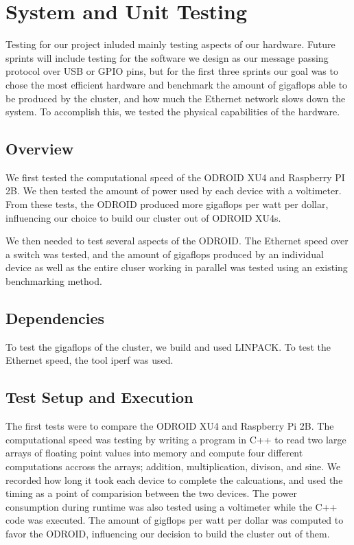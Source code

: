 
\chapter{System  and Unit Testing}

Testing for our project inluded mainly testing aspects of our hardware. Future sprints will include testing for the software we design as our message passing protocol over USB or GPIO pins, but for the first three sprints our goal was to chose the most efficient hardware and benchmark the amount of gigaflops able to be produced by the cluster, and how much the Ethernet network slows down the system. To accomplish this, we tested the physical capabilities of the hardware.

\section{Overview}
We first tested the computational speed of the ODROID XU4 and Raspberry PI 2B. We then tested the amount of power used by each device with a voltimeter. From these tests, the ODROID produced more gigaflops per watt per dollar, influencing our choice to build our cluster out of ODROID XU4s.

We then needed to test several aspects of the ODROID. The Ethernet speed over a switch was tested, and the amount of gigaflops produced by an individual device as well as the entire cluser working in parallel was tested using an existing benchmarking method.


\section{Dependencies}
To test the gigaflops of the cluster, we build and used LINPACK. To test the Ethernet speed, the tool iperf was used.


\section{Test Setup and Execution}
The first tests were to compare the ODROID XU4 and Raspberry Pi 2B. The computational speed was testing by writing a program in C++ to read two large arrays of floating point values into memory and compute four different computations accross the arrays; addition, multiplication, divison, and sine. We recorded how long it took each device to complete the calcuations, and used the timing as a point of comparision between the two devices. The power consumption during runtime was also tested using a voltimeter while the C++ code was executed. The amount of gigflops per watt per dollar was computed to favor the ODROID, influencing our decision to build the cluster out of them.

